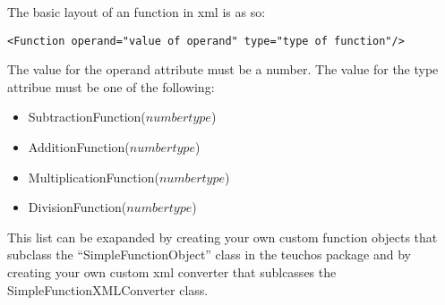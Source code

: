 The basic layout of an function in xml is as so:
\begin{verbatim}
<Function operand="value of operand" type="type of function"/>
\end{verbatim}
The value for the operand attribute must be a number. The value for the type attribue must be
one of the following:
\begin{itemize}
\item SubtractionFunction($number type$)
\item AdditionFunction($number type$)
\item MultiplicationFunction($number type$)
\item DivisionFunction($number type$)
\end{itemize}
This list can be exapanded by creating your own custom function objects that subclass the 
``SimpleFunctionObject'' class in the teuchos package and by creating your own custom
xml converter that sublcasses the SimpleFunctionXMLConverter class.



